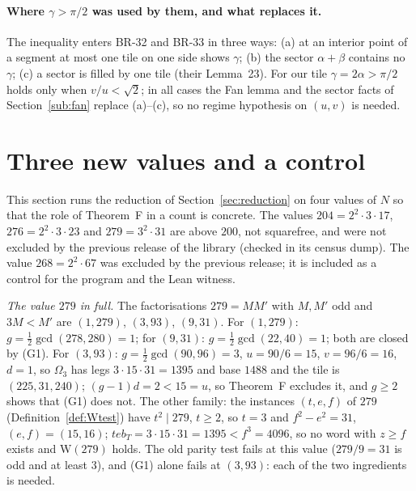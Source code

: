 \documentclass[11pt,reqno]{amsart}
\theoremstyle{plain}
\theoremstyle{definition}
\begin{document}
\paragraph{Where $\gamma>\pi/2$ was used by them, and what replaces it.} The inequality enters BR-32 and BR-33 in three ways: (a) at an interior point of a segment at most one tile on one side shows $\gamma$; (b) the sector $\alpha+\beta$ contains no $\gamma$; (c) a sector is filled by one tile (their Lemma~23). For our tile $\gamma=2\alpha>\pi/2$ holds only when $v/u<\sqrt2$; in all cases the Fan lemma and the sector facts of Section~\ref{sub:fan} replace (a)--(c), so no regime hypothesis on $(u,v)$ is needed.

\section{Three new values and a control}\label{sec:examples}\label{sub:fourvalues}
This section runs the reduction of Section~\ref{sec:reduction} on four values of $N$ so that the role of Theorem~F in a count is concrete. The values $204=2^2\cdot3\cdot17$, $276=2^2\cdot3\cdot23$ and $279=3^2\cdot31$ are above $200$, not squarefree, and were not excluded by the previous release of the library (checked in its census dump). The value $268=2^2\cdot67$ was excluded by the previous release; it is included as a control for the program and the Lean witness.

\emph{The value $279$ in full.} The factorisations $279=MM'$ with $M,M'$ odd and $3M<M'$ are $(1,279)$, $(3,93)$, $(9,31)$. For $(1,279)$: $g=\tfrac12\gcd(278,280)=1$; for $(9,31)$: $g=\tfrac12\gcd(22,40)=1$; both are closed by (G1). For $(3,93)$: $g=\tfrac12\gcd(90,96)=3$, $u=90/6=15$, $v=96/6=16$, $d=1$, so $\Omega_{3}$ has legs $3\cdot15\cdot31=1395$ and base $1488$ and the tile is $(225,31,240)$; $(g-1)d=2<15=u$, so Theorem~F excludes it, and $g\ge2$ shows that (G1) does not. The other family: the instances $(t,e,f)$ of $279$ (Definition~\ref{def:Wtest}) have $t^2\mid279$, $t\ge2$, so $t=3$ and $f^2-e^2=31$, $(e,f)=(15,16)$; $teb_T=3\cdot15\cdot31=1395<f^3=4096$, so no word with $z\ge f$ exists and $\mathrm W(279)$ holds. The old parity test fails at this value ($279/9=31$ is odd and at least $3$), and (G1) alone fails at $(3,93)$: each of the two ingredients is needed.
\end{document}
